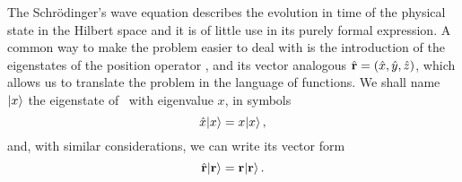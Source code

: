         The Schr\"odinger's wave equation describes the evolution in time of the physical state in the Hilbert space and it is of little use in its purely formal expression. A common way to make the problem easier to deal with is the introduction of the eigenstates of the position operator \hx, and its vector analogous $\hvr = \pqty{\hx,\hy,\hz}$, which allows us to translate the problem in the language of functions. We shall name $\ket{x}$ the eigenstate of \hx\ with eigenvalue $x$, in symbols
        \begin{equation}
            \label{eq:x-eigenvalues}
            \hat{x}\!\ket{x} = x\!\ket{x}
            \text{,}
        \end{equation}
        and, with similar considerations, we can write its vector form
        \begin{equation}
            \label{eq:r-eigenvalues}
            \hat{\vb{r}}\!\ket{\vb{r}} = \vb{r}\!\ket{\vb{r}}
            \text{.}
        \end{equation}

